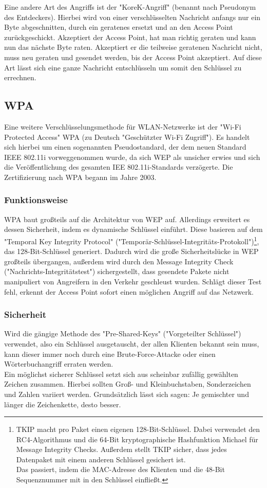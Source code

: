 \documentclass[a4paper,13pt]{scrartcl}
\begin{document}
Eine andere Art des Angriffs ist der "KoreK-Angriff" (benannt nach Pseudonym des Entdeckers). Hierbei wird von einer verschlüsselten Nachricht anfangs nur ein Byte abgeschnitten, durch ein geratenes ersetzt und an den Access Point zurückgeschickt. Akzeptiert der Access Point, hat man richtig geraten und kann nun das nächste Byte raten. Akzeptiert er die teilweise geratenen Nachricht nicht, muss neu geraten und gesendet werden, bis der Access Point akzeptiert. Auf diese Art lässt sich eine ganze Nachricht entschlüsseln um somit den Schlüssel zu errechnen.
\subsection{WPA}
Eine weitere Verschlüsselungsmethode für WLAN-Netzwerke ist der "Wi-Fi Protected Access" WPA (zu Deutsch "Geschützter Wi-Fi Zugriff"). Es handelt sich hierbei um einen sogenannten Pseudostandard, der dem neuen Standard IEEE 802.11i vorweggenommen wurde, da sich WEP als unsicher erwies und sich die Veröffentlichung des gesamten IEE 802.11i-Standards verzögerte. Die Zertifizierung nach WPA begann im Jahre 2003.
\subsubsection{Funktionsweise}
WPA baut großteils auf die Architektur von WEP auf. Allerdings erweitert es dessen Sicherheit, indem es dynamische Schlüssel einführt. Diese basieren auf dem "Temporal Key Integrity Protocol" ("Temporär-Schlüssel-Integritäts-Protokoll")\footnote{TKIP macht pro Paket einen eigenen 128-Bit-Schlüssel. Dabei verwendet den RC4-Algorithmus und die 64-Bit kryptographische Hashfunktion Michael für Message Integrity Checks. Außerdem stellt TKIP sicher, dass jedes Datenpaket mit einem anderen Schlüssel gesichert ist.\\
Das passiert, indem die MAC-Adresse des Klienten und die 48-Bit Sequenznummer mit in den Schlüssel einfließt.}, das 128-Bit-Schlüssel generiert. Dadurch wird die große Sicherheitslücke in WEP großteils übergangen, außerdem wird durch den Message Integrity Check ("Nachrichts-Integritätstest") sichergestellt, dass gesendete Pakete nicht manipuliert von Angreifern in den Verkehr geschleust wurden. Schlägt dieser Test fehl, erkennt der Access Point sofort einen möglichen Angriff auf das Netzwerk.
\clearpage
\subsubsection{Sicherheit}
Wird die gängige Methode des "Pre-Shared-Keys" ("Vorgeteilter Schlüssel") verwendet, also ein Schlüssel ausgetauscht, der allen Klienten bekannt sein muss, kann dieser immer noch durch eine Brute-Force-Attacke oder einen Wörterbuchangriff erraten werden.\\
Ein möglichst sicherer Schlüssel setzt sich aus scheinbar zufällig gewählten Zeichen zusammen. Hierbei sollten Groß- und Kleinbuchstaben, Sonderzeichen und Zahlen variiert werden. Grundsätzlich lässt sich sagen: Je gemischter und länger die Zeichenkette, desto besser.
\end{document}

